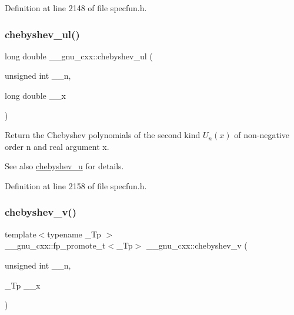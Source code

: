 Definition at line 2148 of file specfun.\+h.

\mbox{\label{group__mathsf__gnu_ga11ec202d6aacafba1182e962ecf02978}} 
\subsubsection{\texorpdfstring{chebyshev\+\_\+ul()}{chebyshev\_ul()}}
{\footnotesize\ttfamily long double \+\_\+\+\_\+gnu\+\_\+cxx\+::chebyshev\+\_\+ul (\begin{DoxyParamCaption}\item[{unsigned int}]{\+\_\+\+\_\+n,  }\item[{long double}]{\+\_\+\+\_\+x }\end{DoxyParamCaption})\hspace{0.3cm}{\ttfamily [inline]}}

Return the Chebyshev polynomials of the second kind $ U_n(x) $ of non-\/negative order {\ttfamily n} and real argument {\ttfamily x}.

\begin{DoxySeeAlso}{See also}
\hyperlink{group__mathsf__gnu_gafa90c06bdedb8459f20576297cf1608f}{chebyshev\+\_\+u} for details. 
\end{DoxySeeAlso}


Definition at line 2158 of file specfun.\+h.

\mbox{\label{group__mathsf__gnu_ga32b7decd0002f542d2c9187c5f0846c6}} 
\subsubsection{\texorpdfstring{chebyshev\+\_\+v()}{chebyshev\_v()}}
{\footnotesize\ttfamily template$<$typename \+\_\+\+Tp $>$ \\
\+\_\+\+\_\+gnu\+\_\+cxx\+::fp\+\_\+promote\+\_\+t$<$\+\_\+\+Tp$>$ \+\_\+\+\_\+gnu\+\_\+cxx\+::chebyshev\+\_\+v (\begin{DoxyParamCaption}\item[{unsigned int}]{\+\_\+\+\_\+n,  }\item[{\+\_\+\+Tp}]{\+\_\+\+\_\+x }\end{DoxyParamCaption})\hspace{0.3cm}{\ttfamily [inline]}}

